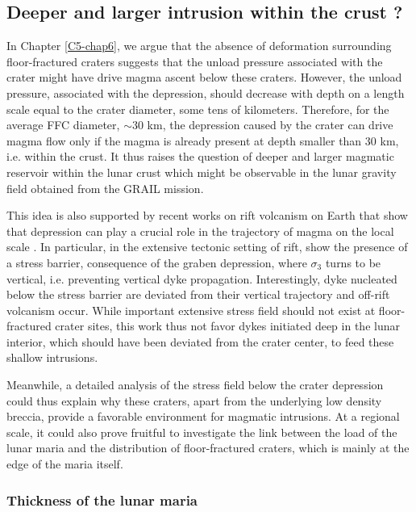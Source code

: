 \subsection{Deeper and larger intrusion within the crust ?}
\label{sec:deep-larg-intr}

In Chapter  \ref{C5-chap6}, we argue  that the absence  of deformation
surrounding floor-fractured craters suggests  that the unload pressure
associated with the  crater might have drive magma  ascent below these
craters. However, the unload pressure, associated with the depression,
should  decrease with  depth on  a length  scale equal  to the  crater
diameter, some  tens of  kilometers.  Therefore,  for the  average FFC
diameter, $\sim 30$ km, the depression  caused by the crater can drive
magma flow only if the magma  is already present at depth smaller than
$30$ km, i.e.  within the crust. It thus raises the question of deeper
and larger  magmatic reservoir within  the lunar crust which  might be
observable in the lunar gravity field obtained from the GRAIL mission.

This idea is also supported by recent works on rift volcanism on Earth
that show that depression can play a crucial role in the trajectory of
magma on the local scale \citep{Maccaferri:2014ft}.  In particular, in
the extensive tectonic setting of rift, \citet{Maccaferri:2014ft} show
the  presence  of   a  stress  barrier,  consequence   of  the  graben
depression, where  $\sigma_3$ turns  to be vertical,  i.e.  preventing
vertical dyke  propagation.  Interestingly,  dyke nucleated  below the
stress  barrier  are  deviated  from  their  vertical  trajectory  and
off-rift  volcanism occur.   While  important  extensive stress  field
should not exist  at floor-fractured crater sites, this  work thus not
favor dykes  initiated deep in  the lunar interior, which  should have
been  deviated  from   the  crater  center,  to   feed  these  shallow
intrusions.

Meanwhile, a  detailed analysis of  the stress field below  the crater
depression  could  thus explain  why  these  craters, apart  from  the
underlying low  density breccia,  provide a favorable  environment for
magmatic  intrusions.   At  a  regional scale,  it  could  also  prove
fruitful to investigate  the link between the load of  the lunar maria
and the  distribution of floor-fractured  craters, which is  mainly at
the edge of the maria itself.

\subsubsection*{Thickness of the lunar maria}
\label{sec:crust-magm-intr}

